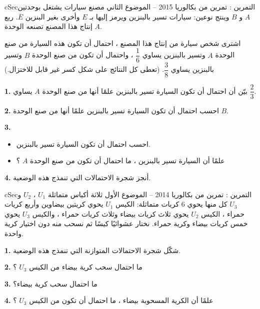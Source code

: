 \documentclass[12pt,a4paper]{article}
\newenvironment{BOX}[2]{\begin{otherlanguage}{english}\begin{arbox}{#1}{#2}}{\end{arbox}\end{otherlanguage}}
\newcounter{exo}
\newenvironment{tamrin}[1]{\stepcounter{exo}\begin{BOX}{cSec}{التمرين \theexo: #1}}{\end{BOX}}
\newenvironment{sq}{\begin{itemize}[leftmargin=2.4em,itemsep=3pt]}{\end{itemize}}
\newcommand{\qa}{\item[(أ)]}\newcommand{\qb}{\item[(ب)]}\newcommand{\qc}{\item[(جـ)]}\newcommand{\qd}{\item[(د)]}\newcommand{\qe}{\item[(هـ)]}
\newcommand{\QQ}[1]{\par\smallskip\textbf{#1.} }
\begin{document}
\begin{tamrin}{تمرين من بكالوريا 2015 -- الموضوع الثاني}
مصنع سيارات يشتغل بوحدتين $A$ و $B$ وينتج نوعين: سيارات تسير بالبنزين ويرمز إليها بـ $E$ وأخرى بغير البنزين $\overline E$. ربع إنتاج هذا المصنع تصنعه الوحدة $A$.
\par اشترى شخص سيارة من إنتاج هذا المصنع ، احتمال أن تكون هذه السيارة من صنع الوحدة $A$ وتسير بالبنزين يساوي $\dfrac16$ ، واحتمال أن تكون من صنع الوحدة $B$ وتسير بالبنزين يساوي $\dfrac38$. (تعطى كل النتائج على شكل كسر غير قابل للاختزال.)
\QQ{1} بيّن أن احتمال أن تكون السيارة تسير بالبنزين علمًا أنها من صنع الوحدة $A$ يساوي $\dfrac23$.
\QQ{2} احسب احتمال أن تكون السيارة تسير بالبنزين علمًا أنها من صنع الوحدة $B$.
\QQ{3}
\begin{sq}
\qa احسب احتمال أن تكون السيارة تسير بالبنزين.
\qb علمًا أن السيارة تسير بالبنزين ، ما احتمال أن تكون من صنع الوحدة $A$ ؟
\end{sq}
\QQ{4} أنجز شجرة الاحتمالات التي تنمذج هذه الوضعية.
\end{tamrin}
\begin{tamrin}{تمرين من بكالوريا 2014 -- الموضوع الأول}
ثلاثة أكياس متماثلة $U_1$ ، $U_2$ و $U_3$ كل منها يحوي $6$ كريات متماثلة: الكيس $U_1$ يحوي كريتين بيضاوين وأربع كريات حمراء ، الكيس $U_2$ يحوي ثلاث كريات بيضاء وثلاث كريات حمراء ، والكيس $U_3$ يحوي خمس كريات بيضاء وكرية حمراء. نختار عشوائيًا كيسًا ثم نسحب منه دون اختيار كرية واحدة.
\QQ{1} شكّل شجرة الاحتمالات المتوازنة التي تنمذج هذه الوضعية.
\QQ{2} ما احتمال سحب كرية بيضاء من الكيس $U_3$ ؟
\QQ{3} ما احتمال سحب كرية بيضاء؟
\QQ{4} علمًا أن الكرية المسحوبة بيضاء ، ما احتمال أن تكون من الكيس $U_3$ ؟
\end{tamrin}
\end{document}
